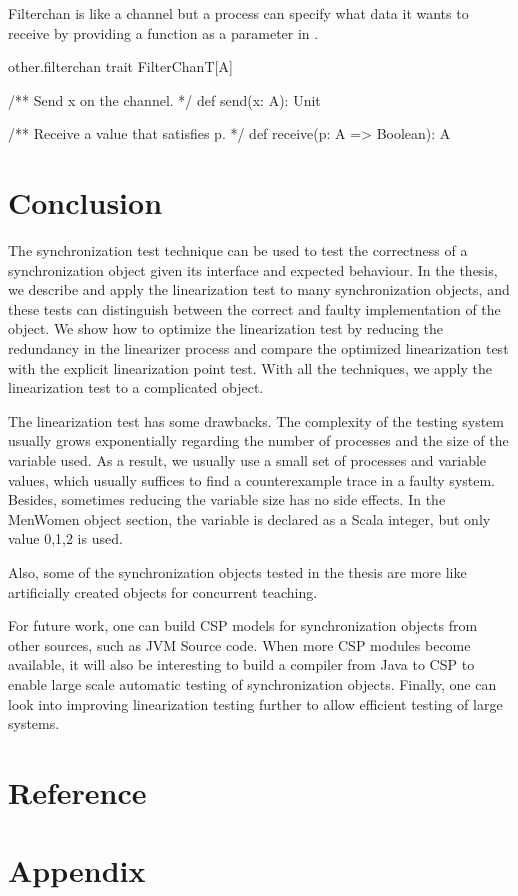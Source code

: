 \documentclass[a4paper, 12pt]{article}
\begin{document}
Filterchan is like a channel but a process can specify what data it wants to receive by providing a function as a parameter in .
\begin{scalafloat}{other.filterchan}{}
trait FilterChanT[A]{
  /** Send x on the channel. */
  def send(x: A): Unit

  /** Receive a value that satisfies p. */
  def receive(p: A => Boolean): A
}
\end{scalafloat}

\newpage
\section{Conclusion}
The synchronization test technique can be used to test the correctness of a synchronization object given its interface and expected behaviour. In the thesis, we describe and apply the linearization test to many synchronization objects, and these tests can distinguish between the correct and faulty implementation of the object. We show how to optimize the linearization test by reducing the redundancy in the linearizer process and compare the optimized linearization test with the explicit linearization point test. With all the techniques, we apply the linearization test to a complicated object. 

The linearization test has some drawbacks. The complexity of the testing system usually grows exponentially regarding the number of processes and the size of the variable used. As a result, we usually use a small set of processes and variable values, which usually suffices to find a counterexample trace in a faulty system. Besides, sometimes reducing the variable size has no side effects. In the MenWomen object section, the variable  is declared as a Scala integer, but only value 0,1,2 is used.

Also, some of the synchronization objects tested in the thesis are more like artificially created objects for concurrent teaching. 

For future work, one can build CSP models for synchronization objects from other sources, such as JVM Source code. When more CSP modules become available, it will also be interesting to build a compiler from Java to CSP to enable large scale automatic testing of synchronization objects. Finally, one can look into improving linearization testing further to allow efficient testing of large systems. 

\newpage
\section{Reference}



\newpage
\section{Appendix}

\end{document}
